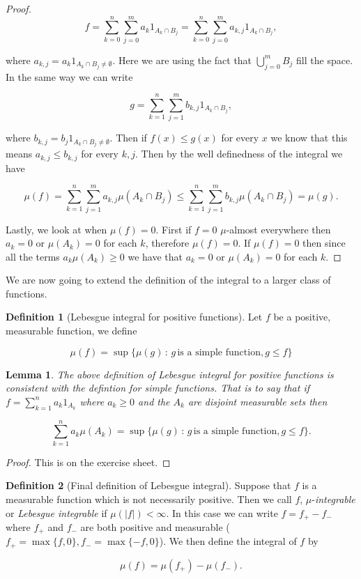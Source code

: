 \documentclass[
]{book}
\newtheorem{lemma}{Lemma}[chapter]
\theoremstyle{definition}
\newtheorem{definition}{Definition}[chapter]
\theoremstyle{definition}
\theoremstyle{definition}
\theoremstyle{definition}
\theoremstyle{remark}
\begin{document}
\begin{proof}
\[ f = \sum_{k=0}^n \sum_{j=0}^m a_k 1_{A_k \cap B_j} = \sum_{k=0}^n \sum_{j=0}^m a_{k,j}1_{A_k \cap B_j},\]

where \(a_{k,j} = a_k 1_{A_k \cap B_j \neq \emptyset}\). Here we are using the fact that \(\bigcup_{j=0}^m B_j\) fill the space. In the same way we can write

\[ g = \sum_{k=1}^n \sum_{j=1}^m b_{k,j}1_{A_k \cap B_j}, \]

where \(b_{k,j} = b_j 1_{A_k \cap B_j \neq \emptyset}\). Then if \(f(x) \leq g(x)\) for every \(x\) we know that this means \(a_{k,j} \leq b_{k,j}\) for every \(k,j\). Then by the well definedness of the integral we have

\[ \mu(f) = \sum_{k=1}^n \sum_{j=1}^m a_{k,j} \mu(A_k \cap B_j) \leq \sum_{k=1}^n \sum_{j=1}^m b_{k,j} \mu(A_k \cap B_j) = \mu(g).\]

Lastly, we look at when \(\mu(f)=0\). First if \(f=0\) \(\mu\)-almost everywhere then \(a_k=0\) or \(\mu(A_k)=0\) for each \(k\), therefore \(\mu(f)=0\). If \(\mu(f) =0\) then since all the terms \(a_k \mu(A_k) \geq 0\) we have that \(a_k=0\) or \(\mu(A_k) =0\) for each \(k\).
\end{proof}

We are now going to extend the definition of the integral to a larger class of functions.

\begin{definition}[Lebesgue integral for positive functions]
Let \(f\) be a positive, measurable function, we define

\[ \mu(f) = \sup \{ \mu(g)\, :\, g \, \mbox{is a simple function}, g \leq f\} \]
\end{definition}

\begin{lemma}
The above definition of Lebesgue integral for positive functions is consistent with the defintion for simple functions. That is to say that if \(f = \sum_{k=1}^n a_k 1_{A_k}\) where \(a_k \geq 0\) and the \(A_k\) are disjoint measurable sets then

\[ \sum_{k=1}^n a_k \mu(A_k) = \sup \{ \mu(g)\, :\, g \, \mbox{is a simple function}, g \leq f\}.  \]
\end{lemma}

\begin{proof}
This is on the exercise sheet.
\end{proof}

\begin{definition}[Final definition of Lebesgue integral]
Suppose that \(f\) is a measurable function which is not necessarily positive. Then we call \(f\), \(\mu\)-\emph{integrable} or \emph{Lebesgue integrable} if \(\mu(|f|)< \infty\). In this case we can write \(f = f_+ - f_{-}\) where \(f_+\) and \(f_-\) are both positive and measurable (\(f_+ = \max\{f, 0\}, f_- = \max \{-f, 0\}\)). We then define the integral of \(f\) by

\[ \mu(f) = \mu(f_+) - \mu(f_-). \]
\end{definition}
\end{document}
